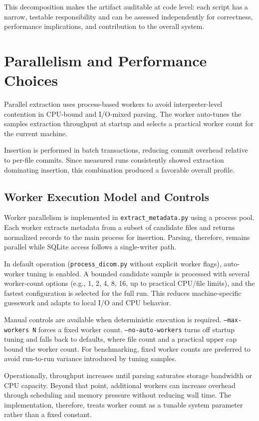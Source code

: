 This decomposition makes the artifact auditable at code level: each script has a narrow, testable responsibility and can be assessed independently for correctness, performance implications, and contribution to the overall system.

\FloatBarrier
\section{Parallelism and Performance Choices}
Parallel extraction uses process-based workers to avoid interpreter-level contention in CPU-bound and I/O-mixed parsing. The worker auto-tunes the samples extraction throughput at startup and selects a practical worker count for the current machine.

Insertion is performed in batch transactions, reducing commit overhead relative to per-file commits. Since measured runs consistently showed extraction dominating insertion, this combination produced a favorable overall profile.

\subsection{Worker Execution Model and Controls}
Worker parallelism is implemented in \texttt{extract\_metadata.py} using a process pool. Each worker extracts metadata from a subset of candidate files and returns normalized records to the main process for insertion. Parsing, therefore, remains parallel while SQLite access follows a single-writer path.

In default operation (\texttt{process\_dicom.py} without explicit worker flags), auto-worker tuning is enabled. A bounded candidate sample is processed with several worker-count options (e.g., 1, 2, 4, 8, 16, up to practical CPU/file limits), and the fastest configuration is selected for the full run. This reduces machine-specific guesswork and adapts to local I/O and CPU behavior.

Manual controls are available when deterministic execution is required. \texttt{--max-workers N} forces a fixed worker count. \texttt{--no-auto-workers} turns off startup tuning and falls back to defaults, where file count and a practical upper cap bound the worker count. For benchmarking, fixed worker counts are preferred to avoid run-to-run variance introduced by tuning samples.

Operationally, throughput increases until parsing saturates storage bandwidth or CPU capacity. Beyond that point, additional workers can increase overhead through scheduling and memory pressure without reducing wall time. The implementation, therefore, treats worker count as a tunable system parameter rather than a fixed constant.

